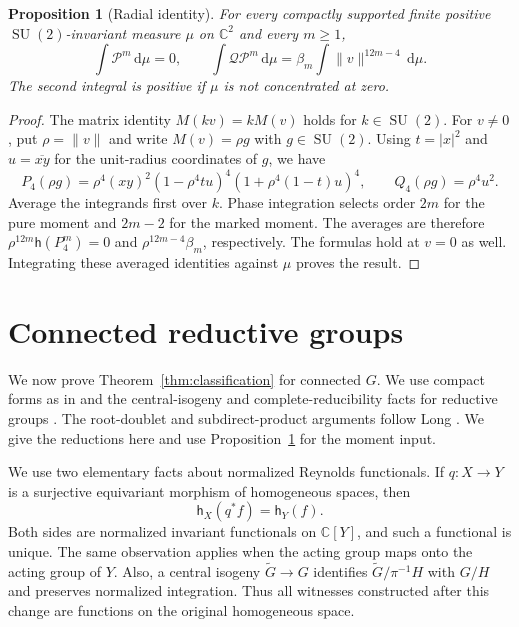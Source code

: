 \documentclass[11pt]{article}
\numberwithin{equation}{section}
\newtheorem{proposition}[theorem]{Proposition}
\theoremstyle{definition}
\theoremstyle{remark}
\newcommand{\C}{\mathbb C}
\newcommand{\dd}{\,\mathrm d}
\newcommand{\h}{\mathsf h}
\newcommand{\SU}{\operatorname{SU}}
\begin{document}
\begin{proposition}[Radial identity]\label{prop:radial}
For every compactly supported finite positive $\SU(2)$-invariant measure
$\mu$ on $\C^2$ and every $m\geq1$,
\begin{equation}\label{eq:radialidentity}
 \int\mathcal P^m\dd\mu=0,\qquad
 \int\mathcal Q\mathcal P^m\dd\mu
 =\beta_m\int\|v\|^{12m-4}\dd\mu.
\end{equation}
The second integral is positive if $\mu$ is not concentrated at zero.
\end{proposition}
\begin{proof}
The matrix identity $M(kv)=kM(v)$ holds for $k\in\SU(2)$.
For $v\ne0$, put $\rho=\|v\|$ and write $M(v)=\rho g$ with $g\in\SU(2)$.
Using $t=|x|^2$ and $u=\overline{xy}$ for the unit-radius coordinates
of $g$, we have
\[
 P_4(\rho g)=\rho^4(xy)^2(1-\rho^4tu)^4(1+\rho^4(1-t)u)^4,
 \qquad Q_4(\rho g)=\rho^4u^2.
\]
Average the integrands first over $k$.
Phase integration selects order $2m$ for the pure moment and $2m-2$
for the marked moment. The averages are therefore $\rho^{12m}\h(P_4^m)=0$
and $\rho^{12m-4}\beta_m$, respectively. The formulas hold at $v=0$ as well.
Integrating these averaged identities against $\mu$ proves the result.
\end{proof}

\section{Connected reductive groups}\label{sec:connected}

We now prove Theorem~\ref{thm:classification} for connected $G$.
We use compact forms as in \cite[Section~3]{AdamsTaibi} and the
central-isogeny and complete-reducibility facts for reductive groups
\cite[Propositions~14.2 and~14.10, Sections~24.1 and~24.4]{Borel}.
The root-doublet and subdirect-product arguments follow Long
\cite[Proposition~3.1 and Lemmas~4.1, 4.2, 6.2]{LongSpherical}.
We give the reductions here and use
Proposition~\ref{prop:radial} for the moment input.

We use two elementary facts about normalized Reynolds functionals.
If $q:X\to Y$ is a surjective equivariant morphism of homogeneous spaces,
then
\begin{equation}\label{eq:pullback}
 \h_X(q^*f)=\h_Y(f).
\end{equation}
Both sides are normalized invariant functionals on $\C[Y]$, and such a
functional is unique. The same observation applies when the acting group
maps onto the acting group of $Y$. Also, a central isogeny
$\widetilde G\to G$ identifies
$\widetilde G/\pi^{-1}H$ with $G/H$ and preserves normalized integration.
Thus all witnesses constructed after this change are functions on the
original homogeneous space.
\end{document}
